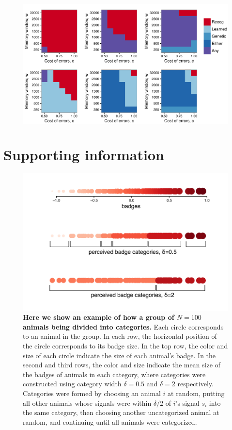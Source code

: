 \begin{figure}
\includegraphics[width=6.85in]{figures/best_type_of_learning.pdf}
\caption{}
\end{figure}

\clearpage{}
\renewcommand{\thesection}{}
\section{Supporting information}
\renewcommand{\thesection}{S}
\renewcommand{\thesubsection}{S\arabic{subsection}}
\renewcommand{\theequation}{S\arabic{equation}}
\renewcommand{\thetable}{S\arabic{table}}
\renewcommand{\thefigure}{S\arabic{figure}}
\setcounter{equation}{0}  
\setcounter{figure}{0}
\setcounter{table}{0}

\begin{figure}[ht]
\includegraphics[width=.8\textwidth]{figures/categories.pdf}
\caption{\sffamily\small\textbf{Here we show an example of how a group of $N=100$ animals being divided into categories.} 
Each circle corresponds to an animal in the group. In each row, the horizontal position of the circle corresponds to its badge size. In the top row, the color and size of each circle indicate the size of each animal's badge. In the second and third rows, the color and size indicate the mean size of the badges of animals in each category, where categories were constructed using category width $\delta=0.5$ and $\delta=2$ respectively. Categories were formed by choosing an animal $i$ at random, putting all other animals whose signals were within $\delta/2$ of $i$'s signal $s_i$ into the same category, then choosing another uncategorized animal at random, and continuing until all animals were categorized.}
 \label{cats_ex}
\end{figure}

